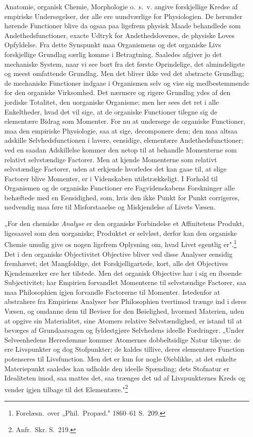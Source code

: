 \documentclass[12pt]{book}
\newcommand{\opage}[1]{\marginnote{\footnotesize\textit{[#1]}}}
\begin{document}
Anatomie, organisk Chemie, Morphologie o.\ s.\ v. angive forskjellige Kredse af empiriske
Undersøgelser, der alle ere uundværlige for Physiologien. De herunder hørende Functioner blive da
ogsaa paa ligefrem physisk Maade behandlede som Andethedsfunctioner, exacte Udtryk for
Andethedslovenes, de physiske Loves Opfyldelse. Fra dette Synspunkt maa Organismens og det
organiske Livs forskjellige Grundlag særlig komme i Betragtning. Saaledes afgiver jo det
mechaniske System, naar vi see bort fra det første Oprindelige, det almindeligste og meest
omfattende Grundlag. Men det bliver ikke ved det abstracte Grundlag; de mechaniske Functioner
indgaae i Organismen selv og vise sig medbestemmende for den organiske Virksomhed. Det nærmere og
rigere Grundlag ydes af den jordiske Totalitet, den uorganiske Organisme; men her sees det ret i
alle Enkeltheder, hvad det vil sige, at de organiske Functioner tilegne sig de elementære Bidrag
som Momenter. For nu at undersøge de organiske Functioner,
\opage{409} maa den empiriske Physiologie, saa at sige, decomponere dem; den maa altsaa adskille
Selvhedsfunctionen i lavere, eensidige, elementære Andethedsfunctioner; ved en saadan Adskillelse
kommer den netop til at behandle Momenterne som relativt selvstændige Factorer. Men at kjende
Momenterne som relativt selvstændige Factorer, uden at erkjende hvorledes det kan gaae til, at slige
Factorer blive Momenter, er i Videnskaben utilstrækkeligt. I Forhold til Organismen og de organiske
Functioner ere Fagvidenskabens Forskninger alle behæftede med en Eensidighed, som, hvis den ikke
Punkt for Punkt corrigeres, nødvendig maa føre til Misforstaaelse og Miskjendelse af Livets Væsen.

„For den chemiske \emph{Analyse} er den organiske Forbindelse et Affinitetens Produkt, ligesaavel
som den uorganiske; Produktet er selvløst, derfor kan den organiske Chemie umulig give os nogen
ligefrem Oplysning om, hvad Livet egentlig er".\footnote{Forelæsn.\ over „Phil.\ Propæd." 1860--61
S.~209.} Det i den organiske Objectivitet Objective bliver ved disse Analyser eensidig fremhævet; det
Mangfoldige, det Forskjelligartede, kort, alle det Objectives Kjendemærker ere her tilstede. Men det
organisk Objective har i sig en iboende Subjectivitet; har Empirien forvandlet Momenterne til
selvstændige Factorer, saa maa Philosophien igjen forvandle Factorerne til Momenter. Istedenfor at
abstrahere fra Empiriens Analyser bør Philosophien tvertimod trænge ind i deres Væsen, og omdanne dem
til Beviser for den Bøielighed, hvormed Materien, uden at opgive sin Materialitet, sine Atomers
relative Selvstændighed, er istand til at bevæges af Grundaarsagen og fyldestgjøre Selvhedens ideelle
Fordringer. „Under Selveenhedens Herredømme kommer Atomernes dobbeltsidige Natur tilsyne: de ere
Livspunkter og dog Stofpunkter; de kaldes tillive, deres elementære Function potenseres til
Livsfunction. Men det er kun for nogle Øieblikke, at det enkelte Materiepunkt
\opage{410} saaledes kan udholde den ideelle Spænding; dets Stofnatur er Idealiteten imod, saa mattes det, saa
trænges det ud af Livspunkternes Kreds og vender igjen tilbage til det Elementære."\footnote{Anfr.\
Skr. S.~219.}
\end{document}
